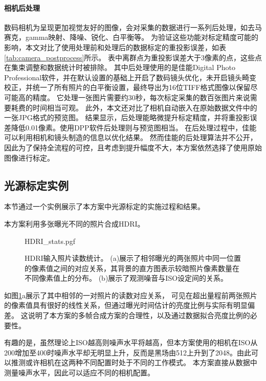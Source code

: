 \paragraph{相机后处理}
数码相机为呈现更加视觉友好的图像，会对采集的数据进行一系列后处理，如去马赛克，gamma映射、降噪、锐化、白平衡等。
为验证这些功能对标定精度可能的影响，本文对比了使用处理前和处理后的数据标定的重投影误差，如表\ref{tab:camera_postprocess}所示。
表中离群点为重投影误差大于3像素的点，这些点在集束调整和数据统计时被排除。
其中后处理使用的是佳能Digital Photo Professional软件，并在默认设置的基础上开启了数码镜头优化，未开启镜头畸变校正，并统一了所有照片的白平衡设置，最终导出为16位TIFF格式图像以保留尽可能高的精度。
它处理一张图片需要约30秒，每次标定采集的数百张图片来说需要耗费的时间相当可观。
此外，本文还对比了相机自动嵌入在原始数据文件中的一张JPG格式的预览图。
结果显示，后处理能略微提升标定精度，并将重投影误差降低0.01像素。使用DPP软件后处理则与预览图相当。
在后处理过程中，佳能可以利用相机和镜头制造的信息以优化结果。
然而佳能的后处理算法并不公开，因此为了保持全流程的可控，且考虑到提升幅度不大，本方案依然选择了使用原始图像进行标定。

\subsection{光源标定实例}

本节通过一个实例展示了本方案中光源标定的实施过程和结果。

本方案利用多张曝光不同的照片合成HDRI。
\begin{figure}
    \centering
    {HDRI_stats.pgf}
    \caption[HDRI输入照片读数统计]{HDRI输入照片读数统计。
    (a)展示了相邻曝光的两张照片中同一位置的像素值之间的对应关系，其背景的直方图表示较暗照片像素数量在不同像素值上的分布。
    (b)展示了观测噪音与ISO设定间的关系。}
    \label{fig:HDRI_stat}
\end{figure}
如图\ref{fig:HDRI_stat}a展示了其中相邻的一对照片的读数对应关系，
可见在超出量程前两张照片的像素值具有很好的线性关系，但通过曝光时间估计的亮度比例与实际有明显偏差。
这说明了本方案的多帧合成方案的合理性，以及通过数据拟合亮度比例的必要性。

有趣的是，虽然理论上ISO越高则噪声水平将越高，但本方案使用的相机在ISO从200增加至400时噪声水平却无明显上升，反而是黑场由512上升到了2048。由此可以推测或许相机在这两种不同配置时处于不同的工作模式。
本方案直接从数据中测量噪声水平，因此可以适应不同的相机配置。

